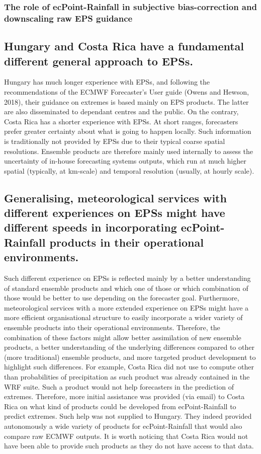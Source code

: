 \documentclass[twocol]{ametsocV5} %
\begin{document}
\subsubsection{The role of ecPoint-Rainfall in subjective bias-correction and downscaling raw EPS guidance}



\subsection{Hungary and Costa Rica have a fundamental different general approach to EPSs.} 
    Hungary has much longer experience with EPSs, and following the recommendations of the ECMWF Forecaster’s User guide (Owens and Hewson, 2018), their guidance on extremes is based mainly on EPS products. The latter are also disseminated to dependant centres and the public. On the contrary, Costa Rica has a shorter experience with EPSs. At short ranges, forecasters prefer greater certainty about what is going to happen locally. Such information is traditionally not provided by EPSs due to their typical coarse spatial resolutions. Ensemble products are therefore mainly used internally to assess the uncertainty of in-house forecasting systems outputs, which run at much higher spatial (typically, at km-scale) and temporal resolution (usually, at hourly scale). 

\subsection{Generalising, meteorological services with different experiences on EPSs might have different speeds in incorporating ecPoint-Rainfall products in their operational environments.}
    Such different experience on EPSs is reflected mainly by a better understanding of standard ensemble products and which one of those or which combination of those would be better to use depending on the forecaster goal. Furthermore, meteorological services with a more extended experience on EPSs might have a more efficient organisational structure to easily incorporate a wider variety of ensemble products into their operational environments. Therefore, the combination of these factors might allow better assimilation of new ensemble products, a better understanding of the underlying differences compared to other (more traditional) ensemble products, and more targeted product development to highlight such differences. For example, Costa Rica did not use to compute other than probabilities of precipitation as such product was already contained in the WRF suite. Such a product would not help forecasters in the prediction of extremes. Therefore, more initial assistance was provided (via email) to Costa Rica on what kind of products could be developed from ecPoint-Rainfall to predict extremes. Such help was not supplied to Hungary. They indeed provided autonomously a wide variety of products for ecPoint-Rainfall that would also compare raw ECMWF outputs. It is worth noticing that Costa Rica would not have been able to provide such products as they do not have access to that data.  
\end{document}
